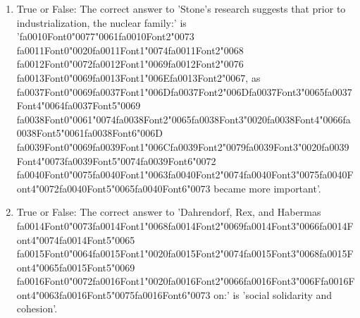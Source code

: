 \documentclass[12pt]{article}
\begin{document}
\begin{enumerate}[label=\arabic*.]
\item True or False: The correct answer to 'Stone's research suggests that prior to industrialization, the nuclear family:' is '{\csname fa0010Font0\endcsname\char"0077}{\char"0061}{\csname fa0010Font2\endcsname\char"0073} {\csname fa0011Font0\endcsname\char"0020}{\csname fa0011Font1\endcsname\char"0074}{\csname fa0011Font2\endcsname\char"0068} {\csname fa0012Font0\endcsname\char"0072}{\csname fa0012Font1\endcsname\char"0069}{\csname fa0012Font2\endcsname\char"0076} {\csname fa0013Font0\endcsname\char"0069}{\csname fa0013Font1\endcsname\char"006E}{\csname fa0013Font2\endcsname\char"0067}, as {\csname fa0037Font0\endcsname\char"0069}{\csname fa0037Font1\endcsname\char"006D}{\csname fa0037Font2\endcsname\char"006D}{\csname fa0037Font3\endcsname\char"0065}{\csname fa0037Font4\endcsname\char"0064}{\csname fa0037Font5\endcsname\char"0069} {\csname fa0038Font0\endcsname\char"0061}{\char"0074}{\csname fa0038Font2\endcsname\char"0065}{\csname fa0038Font3\endcsname\char"0020}{\csname fa0038Font4\endcsname\char"0066}{\csname fa0038Font5\endcsname\char"0061}{\csname fa0038Font6\endcsname\char"006D} {\csname fa0039Font0\endcsname\char"0069}{\csname fa0039Font1\endcsname\char"006C}{\csname fa0039Font2\endcsname\char"0079}{\csname fa0039Font3\endcsname\char"0020}{\csname fa0039Font4\endcsname\char"0073}{\csname fa0039Font5\endcsname\char"0074}{\csname fa0039Font6\endcsname\char"0072} {\csname fa0040Font0\endcsname\char"0075}{\csname fa0040Font1\endcsname\char"0063}{\csname fa0040Font2\endcsname\char"0074}{\csname fa0040Font3\endcsname\char"0075}{\csname fa0040Font4\endcsname\char"0072}{\csname fa0040Font5\endcsname\char"0065}{\csname fa0040Font6\endcsname\char"0073} became more important'.
\item True or False: The correct answer to 'Dahrendorf, Rex, and Habermas {\csname fa0014Font0\endcsname\char"0073}{\csname fa0014Font1\endcsname\char"0068}{\csname fa0014Font2\endcsname\char"0069}{\csname fa0014Font3\endcsname\char"0066}{\csname fa0014Font4\endcsname\char"0074}{\csname fa0014Font5\endcsname\char"0065} {\csname fa0015Font0\endcsname\char"0064}{\csname fa0015Font1\endcsname\char"0020}{\csname fa0015Font2\endcsname\char"0074}{\csname fa0015Font3\endcsname\char"0068}{\csname fa0015Font4\endcsname\char"0065}{\csname fa0015Font5\endcsname\char"0069} {\csname fa0016Font0\endcsname\char"0072}{\csname fa0016Font1\endcsname\char"0020}{\csname fa0016Font2\endcsname\char"0066}{\csname fa0016Font3\endcsname\char"006F}{\csname fa0016Font4\endcsname\char"0063}{\csname fa0016Font5\endcsname\char"0075}{\csname fa0016Font6\endcsname\char"0073} on:' is 'social solidarity and cohesion'.

\end{enumerate}
\end{document}
